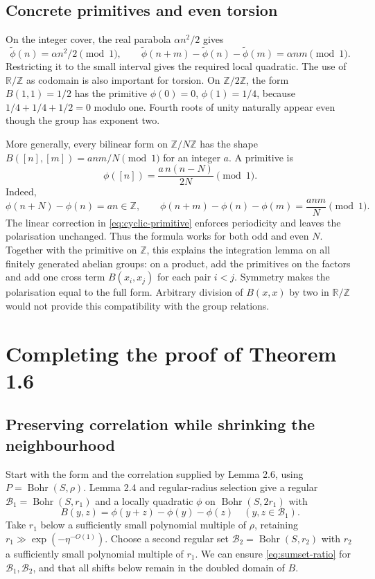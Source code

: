 \documentclass[11pt,a4paper]{article}
\newcommand{\T}{\mathbb R/\mathbb Z}
\newcommand{\Z}{\mathbb Z}
\newcommand{\Bohr}{\operatorname{Bohr}}
\newcommand{\bb}{\mathcal B}
\newcommand{\ipoly}{\eta^{-O(1)}}
\theoremstyle{definition}
\numberwithin{equation}{section}
\begin{document}
\subsection{Concrete primitives and even torsion}
On the integer cover, the real parabola $\alpha n^2/2$ gives
\[
\widetilde\phi(n)=\alpha n^2/2\pmod1,
\qquad
\widetilde\phi(n+m)-\widetilde\phi(n)-\widetilde\phi(m)=\alpha nm\pmod1.
\]
Restricting it to the small interval gives the required local quadratic.
The use of $\T$ as codomain is also important for torsion. On
$\Z/2\Z$, the form $B(1,1)=1/2$ has the primitive
$\phi(0)=0$, $\phi(1)=1/4$, because
$1/4+1/4+1/2=0$ modulo one. Fourth roots of unity naturally appear
even though the group has exponent two.

More generally, every bilinear form on $\Z/N\Z$ has the shape
$B([n],[m])=anm/N\pmod1$ for an integer $a$. A primitive is
\begin{equation}\label{eq:cyclic-primitive}
\phi([n])=\frac{a\,n(n-N)}{2N}\pmod1.
\end{equation}
Indeed,
\[
\phi(n+N)-\phi(n)=an\in\Z,\qquad
\phi(n+m)-\phi(n)-\phi(m)=\frac{anm}{N}\pmod1.
\]
The linear correction in \eqref{eq:cyclic-primitive} enforces periodicity
and leaves the polarisation unchanged. Thus the formula works for both
odd and even $N$. Together with the primitive on $\Z$, this explains
the integration lemma on all finitely generated abelian groups: on a
product, add the primitives on the factors and add one cross term
$B(x_i,x_j)$ for each pair $i<j$. Symmetry makes the polarisation equal
to the full form. Arbitrary division of $B(x,x)$ by two in $\T$ would
not provide this compatibility with the group relations.

\section{Completing the proof of Theorem 1.6}\label{sec:finish}
\subsection{Preserving correlation while shrinking the neighbourhood}
Start with the form and the correlation supplied by Lemma 2.6, using
$P=\Bohr(S,\rho)$. Lemma 2.4 and regular-radius selection give a
regular $\bb_1=\Bohr(S,r_1)$ and a locally quadratic $\phi$ on
$\Bohr(S,2r_1)$ with
\begin{equation}\label{eq:polarisation}
B(y,z)=\phi(y+z)-\phi(y)-\phi(z)
\quad(y,z\in\bb_1).
\end{equation}
Take $r_1$ below a sufficiently small polynomial multiple of $\rho$,
retaining $r_1\gg\exp(-\ipoly)$. Choose a second regular set
$\bb_2=\Bohr(S,r_2)$ with $r_2$ a sufficiently small polynomial
multiple of $r_1$. We can ensure \eqref{eq:sumset-ratio} for
$\bb_1,\bb_2$, and that all shifts below remain in the doubled
domain of $B$.
\end{document}

